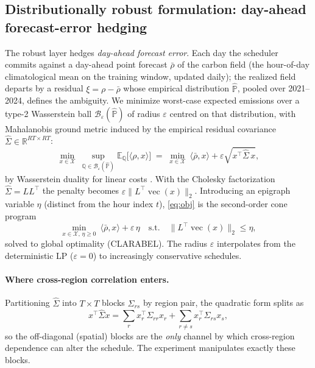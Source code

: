 \documentclass[12pt]{article}
\newcommand{\vecx}{\operatorname{vec}}
\newcommand{\R}{\mathbb{R}}
\newcommand{\E}{\mathbb{E}}
\begin{document}
\subsection{Distributionally robust formulation: day-ahead forecast-error hedging}
The robust layer hedges \emph{day-ahead forecast error}. Each day the scheduler commits
against a day-ahead point forecast $\bar\rho$ of the carbon field (the hour-of-day
climatological mean on the training window, updated daily); the realized field departs
by a residual $\xi=\rho-\bar\rho$ whose empirical distribution $\hat{\mathbb P}$,
pooled over 2021--2024, defines the ambiguity. We minimize worst-case expected
emissions over a type-2 Wasserstein ball $\mathcal{B}_\varepsilon(\hat{\mathbb P})$ of
radius $\varepsilon$ centred on that distribution, with Mahalanobis ground metric
induced by the empirical residual covariance $\hat\Sigma\in\R^{RT\times RT}$:
\begin{equation}
\min_{x\in\mathcal{X}}\ \sup_{\mathbb{Q}\in\mathcal{B}_\varepsilon(\hat{\mathbb{P}})}
\E_{\mathbb{Q}}\big[\langle\rho,x\rangle\big]
\;=\;
\min_{x\in\mathcal{X}}\ \langle\bar\rho,x\rangle
+\varepsilon\sqrt{x^\top\hat\Sigma\,x},
\label{eq:obj}
\end{equation}
by Wasserstein duality for linear costs \citep{esfahani2018,blanchet2019}. With the
Cholesky factorization
$\hat\Sigma=LL^\top$ the penalty becomes $\varepsilon\lVert
L^\top\vecx(x)\rVert_2$. Introducing an epigraph variable $\eta$ (distinct from the
hour index $t$), \eqref{eq:obj} is the second-order cone program
\begin{equation}
\min_{x\in\mathcal X,\,\eta\ge0}\ \langle\bar\rho,x\rangle+\varepsilon\,\eta
\quad\text{s.t.}\quad \big\lVert L^\top\vecx(x)\big\rVert_2\le\eta,
\label{eq:socp}
\end{equation}
solved to global optimality (CLARABEL). The radius $\varepsilon$ interpolates from
the deterministic LP ($\varepsilon=0$) to increasingly conservative schedules.

\paragraph{Where cross-region correlation enters.}
Partitioning $\hat\Sigma$ into $T\times T$ blocks $\Sigma_{rs}$ by region pair, the
quadratic form splits as
\begin{equation}
x^\top\hat\Sigma x=\sum_r x_r^\top\Sigma_{rr}x_r
+\sum_{r\neq s}x_r^\top\Sigma_{rs}x_s,
\label{eq:quad}
\end{equation}
so the off-diagonal (spatial) blocks are the \emph{only} channel by which
cross-region dependence can alter the schedule. The experiment manipulates exactly
these blocks.
\end{document}
